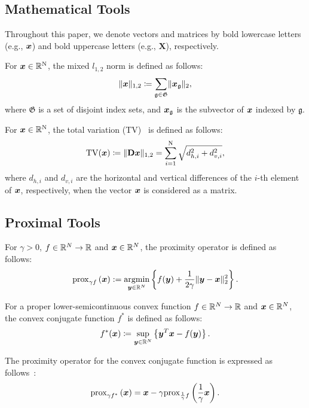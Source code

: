 \subsection{Mathematical Tools}\label{subsec:mathematical-tools}

Throughout this paper, we denote vectors and matrices by bold lowercase letters (e.g., $\bm{x}$) and bold uppercase letters (e.g., $\bm{X}$), respectively.

For $\bm{x} \in \mathbb{R}^{\mathrm{N}}$, the mixed $l_{1,2}$ norm is defined as follows:
\begin{equation} \label{eq:L12NormDefinitionEq} \lVert \bm{x} \rVert _{1,2} \coloneq \sum_{\mathfrak{g} \in \mathfrak{G}} \lVert \bm{x}_\mathfrak{g} \rVert _2, \end{equation}
where $\mathfrak{G}$ is a set of disjoint index sets, and $\bm{x}_{\mathfrak{g}}$ is the subvector of $\bm{x}$ indexed by $\mathfrak{g}$.

For $\bm{x} \in \mathbb{R}^{\mathrm{N}}$, the total variation (TV)~\cite{TV} is defined as follows:
\begin{equation} \label{eq:TVDefinitionEq} \mathrm{TV}(\bm{x}) \coloneq \lVert \mathbf{D} \bm{x} \rVert _{1,2} = \sum_{i=1}^{\mathrm{N}} \sqrt{d_{h,i}^2 + d_{v,i}^2}, \end{equation}
where $d_{h,i}$ and $d_{v,i}$ are the horizontal and vertical differences of the $i$-th element of $\bm{x}$, respectively, when the vector $\bm{x}$ is considered as a matrix.



\subsection{Proximal Tools}\label{subsec:proximal-tools}
For $\gamma > 0$, $f \in \mathbb{R}^N \to \mathbb{R}$ and $\bm{x} \in \mathbb{R}^N$, the proximity operator is defined as follows:
\begin{equation} \label{eq:ProximityOperatorDefinitionEq} \mathrm{prox}_{ \gamma f }\left(\bm{x}\right) := \underset{\bm{y} \in \mathbb{R}^N}{\mathrm{argmin}} \left\{ f(\bm{y}) + \frac{1}{2 \gamma} \lVert \bm{y} - \bm{x} \rVert _2^2 \right\}. \end{equation}

For a proper lower-semicontinuous convex function $f \in \mathbb{R}^N \to \mathbb{R}$ and $\bm{x} \in \mathbb{R}^N$, the convex conjugate function $f^*$ is defined as follows:
\begin{equation} \label{eq:ConjugateFunctionDefinitionEq} f^*(\bm{x}) \coloneq \sup_{\bm{y} \in \mathbb{R}^N} \left\{ \bm{y}^T \bm{x} - f(\bm{y}) \right\}. \end{equation}

The proximity operator for the convex conjugate function is expressed as follows~\cite[Theorem 3.1 (ii)]{prox-convex-conjugate-function}:
\begin{equation} \label{eq:ProximityOperatorDefinitionWithConvexConjugateFunctionEq} \mathrm{prox}_{ \gamma f^* }\left(\bm{x}\right) = \bm{x} - \gamma \mathrm{prox}_{ \frac 1 \gamma f }\left(\frac 1 \gamma \bm{x}\right). \end{equation}


